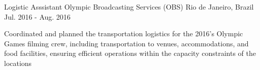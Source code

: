   \cventry
    {Logistic Asssistant} %
    {Olympic Broadcasting Services (OBS)} %
    {Rio de Janeiro, Brazil} %
    {Jul. 2016 - Aug. 2016} %
    {
      \begin{cvitems} %
        \item {Coordinated and planned the transportation logistics for the 2016's Olympic Games filming crew, including transportation to venues, accommodations, and food facilities, ensuring efficient operations within the capacity constraints of the locations}
      \end{cvitems}
    }

